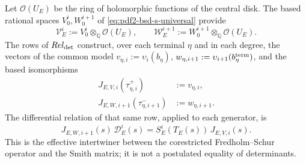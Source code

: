 Let $\mathcal O(U_E)$ be the ring of holomorphic functions of the central disk.
The based rational spaces $V_0^i,W_0^{i+1}$ of
\eqref{eq:pdf2-bsd-s-universal} provide
\begin{equation}\label{eq:pdf2-bsd-dominios-analiticos}
 \mathscr V_E^i:=V_0^i\otimes_{\mathbb Q}\mathcal O(U_E),
 \qquad
 \mathscr W_E^{i+1}:=W_0^{i+1}\otimes_{\mathbb Q}\mathcal O(U_E).
\end{equation}
The rows of $\operatorname{Rel}_{\rm det}$ construct, over each terminal
$\eta$ and in each degree, the vectors of the common model
$v_{\eta,i}:=\upsilon_i(b_\eta)$,
$w_{\eta,i+1}:=\upsilon_{i+1}(b_\eta^{\rm term})$, and the based isomorphisms
\begin{equation}\label{eq:pdf2-bsd-jvw-generadores}
 \begin{aligned}
  J_{E,V,i}(\tau_{\eta,i}^+)&:=v_{\eta,i},\\
  J_{E,W,i+1}(\tau_{\eta,i+1}^-)&:=w_{\eta,i+1}.
 \end{aligned}
\end{equation}
The differential relation of that same row, applied to each generator, is
\begin{equation}\label{eq:pdf2-bsd-entrelazamiento-analitico-smith}
 \boxed{
 J_{E,W,i+1}(s)\,\mathscr D_E^i(s)
 =S_E^i(T_E(s))\,J_{E,V,i}(s).}
\end{equation}
This is the effective intertwiner between the corestricted Fredholm--Schur operator and the
Smith matrix; it is not a postulated equality of determinants.

